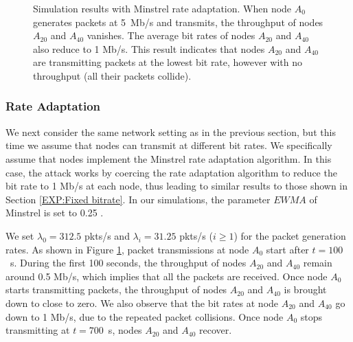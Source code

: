 \documentclass{IEEEtran}
\begin{document}
\begin{figure}[!t]
\centering
{}
\vfil
{}
\caption{Simulation results with Minstrel rate adaptation. When node
  $A_0$ generates packets at 5~Mb/s and transmits, the throughput of nodes $A_{20}$ and $A_{40}$
  vanishes. The average bit rates of nodes $A_{20}$ and $A_{40}$ also
  reduce to 1 Mb/s. This result indicates that nodes $A_{20}$ and
  $A_{40}$ are transmitting packets at the lowest bit rate,
  however with no throughput (all their packets collide).}
\label{Simulation Result with Minstrel Rate Adaptation}
\end{figure}


\subsubsection{Rate Adaptation}
\label{Rate Adaption}
We next consider the same network setting as in the previous section,
but this time we assume that nodes can transmit at different bit rates.
We specifically assume that nodes implement the Minstrel rate adaptation algorithm.
In this case, the attack works by coercing the rate adaptation algorithm to reduce the bit rate
to 1 Mb/s at each node, thus leading to similar results to those shown in Section
\ref{EXP:Fixed bitrate}. In our simulations, the parameter $\textit{EWMA}$ of Minstrel is set to 0.25 \cite{xia2013evaluation}.


We set $\lambda_0 =312.5$ pkts/s and
$\lambda_i = 31.25$ pkts/s ($i \geq 1$) for the packet generation rates. As shown in Figure \ref{Simulation Result with Minstrel Rate Adaptation},
packet transmissions at
node $A_0$ start after $t=100$~s.
During the first 100 seconds, the throughput of nodes $A_{20}$ and
$A_{40}$ remain around 0.5 Mb/s, which implies that all the packets are
received.
Once node $A_0$ starts transmitting packets,
the throughput of nodes $A_{20}$ and $A_{40}$ is brought down to close
to zero. We also observe that the bit rates at node $A_{20}$ and $A_{40}$ go down to 1 Mb/s,
due to the repeated packet collisions. Once node
$A_0$ stops transmitting at $t=700$~s, nodes $A_{20}$ and $A_{40}$ recover.
\end{document}
